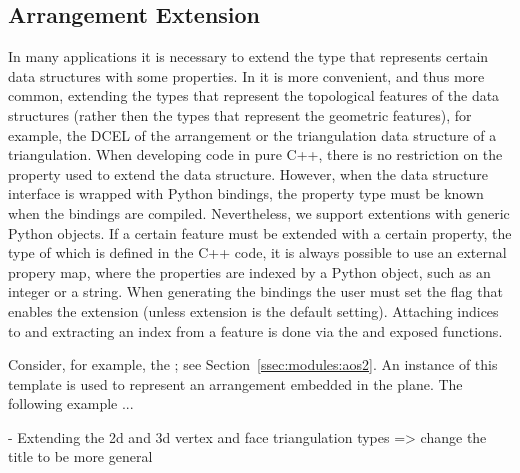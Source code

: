 \subsection{Arrangement Extension}
\label{sec:code:ae}
In many applications it is necessary to extend the type that
represents certain \cgal{} data structures with some properties. In
\cgal{} it is more convenient, and thus more common, extending the
types that represent the topological features of the data structures
(rather then the types that represent the geometric features), for
example, the DCEL of the arrangement or the triangulation data
structure of a triangulation. When developing code in pure C++, there
is no restriction on the property used to extend the data structure.
However, when the data structure interface is wrapped with Python
bindings, the property type must be known when the bindings are
compiled. Nevertheless, we support extentions with generic Python
objects. If a certain feature must be extended with a certain
property, the type of which is defined in the C++ code, it is always
possible to use an external propery map, where the properties are
indexed by a Python object, such as an integer or a string. When
generating the bindings the user must set the flag that enables the
extension (unless extension is the default setting). Attaching indices
to and extracting an index from a feature is done via the
 and  exposed functions.

Consider, for example, the ;
see Section~\ref{ssec:modules:aos2}. An instance of this template is
used to represent an arrangement embedded in the plane. The following
example ...

- Extending the 2d and 3d vertex and face triangulation types => change the title to be more general

